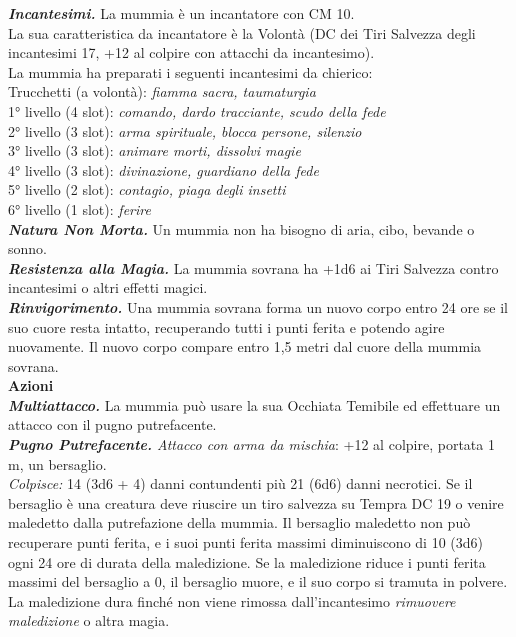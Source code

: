 \begin{multicols}{2}
\emph{\textbf{Incantesimi.}} La mummia è un incantatore con CM 10.\\
La sua caratteristica da incantatore è la Volontà (DC dei Tiri Salvezza degli incantesimi 17, +12 al colpire con attacchi da incantesimo).\\
La mummia ha preparati i seguenti incantesimi da chierico:\\
Trucchetti (a volontà): \emph{fiamma sacra, taumaturgia}\\
1° livello (4 slot): \emph{comando, dardo tracciante, scudo della fede}\\
2° livello (3 slot): \emph{arma spirituale, blocca persone, silenzio}\\
3° livello (3 slot): \emph{animare morti, dissolvi magie}\\
4° livello (3 slot): \emph{divinazione, guardiano della fede}\\
5° livello (2 slot): \emph{contagio, piaga degli insetti}\\
6° livello (1 slot): \emph{ferire}\\
\emph{\textbf{Natura Non Morta.}} Un mummia non ha bisogno di aria, cibo, bevande o sonno.\\
\emph{\textbf{Resistenza alla Magia.}} La mummia sovrana ha +1d6 ai Tiri Salvezza contro incantesimi o altri effetti magici.\\
\emph{\textbf{Rinvigorimento.}} Una mummia sovrana forma un nuovo corpo entro 24 ore se il suo cuore resta intatto, recuperando tutti i punti ferita e potendo agire nuovamente. Il nuovo corpo compare entro 1,5 metri dal cuore della mummia sovrana.\\
\smallskip\textbf{Azioni}\\
\emph{\textbf{Multiattacco.}} La mummia può usare la sua Occhiata Temibile ed effettuare un attacco con il pugno putrefacente.\\
\emph{\textbf{Pugno Putrefacente.} Attacco con arma da mischia}: +12 al colpire, portata 1 m, un bersaglio.\\
\emph{Colpisce:} 14 (3d6 + 4) danni contundenti più 21 (6d6) danni necrotici. Se il bersaglio è una creatura deve riuscire un tiro salvezza su Tempra DC  19 o venire maledetto dalla putrefazione della mummia. Il bersaglio maledetto non può recuperare punti ferita, e i suoi punti ferita massimi diminuiscono di 10 (3d6) ogni 24 ore di durata della maledizione. Se la maledizione riduce i punti ferita massimi del bersaglio a 0, il bersaglio muore, e il suo corpo si tramuta in polvere. La maledizione dura finché non viene rimossa dall'incantesimo \emph{rimuovere maledizione} o altra magia.\\


\end{multicols}
